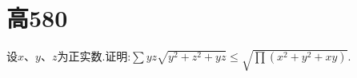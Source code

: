 \documentclass[question]{article}
\title{}
\author{}
\date{}
\begin{document}
\maketitle
\section{高580}{
设$\displaystyle x、y、z$为正实数.证明:$\displaystyle\sum yz\sqrt{y^2+z^2+yz}\leq \sqrt{\prod(x^2+y^2+xy)}$.
}
\end{document}
